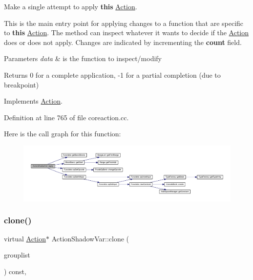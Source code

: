 Make a single attempt to apply {\bfseries{this}} \mbox{\hyperlink{class_action}{Action}}. 

This is the main entry point for applying changes to a function that are specific to {\bfseries{this}} \mbox{\hyperlink{class_action}{Action}}. The method can inspect whatever it wants to decide if the \mbox{\hyperlink{class_action}{Action}} does or does not apply. Changes are indicated by incrementing the {\bfseries{count}} field. 
\begin{DoxyParams}{Parameters}
{\em data} & is the function to inspect/modify \\
\hline
\end{DoxyParams}
\begin{DoxyReturn}{Returns}
0 for a complete application, -\/1 for a partial completion (due to breakpoint) 
\end{DoxyReturn}


Implements \mbox{\hyperlink{class_action_aac1c3999d6c685b15f5d9765a4d04173}{Action}}.



Definition at line 765 of file coreaction.\+cc.

Here is the call graph for this function\+:
\nopagebreak
\begin{figure}[H]
\begin{center}
\leavevmode
\includegraphics[width=350pt]{class_action_shadow_var_aac5164f51e21d4e76da14d7c2063c149_cgraph}
\end{center}
\end{figure}
\mbox{\label{class_action_shadow_var_ad60ce611f28bd7c51a34b8905cfe0155}} 
\subsubsection{\texorpdfstring{clone()}{clone()}}
{\footnotesize\ttfamily virtual \mbox{\hyperlink{class_action}{Action}}$\ast$ Action\+Shadow\+Var\+::clone (\begin{DoxyParamCaption}\item[{const \mbox{\hyperlink{class_action_group_list}{Action\+Group\+List}} \&}]{grouplist }\end{DoxyParamCaption}) const\hspace{0.3cm}{\ttfamily [inline]}, {\ttfamily [virtual]}}



